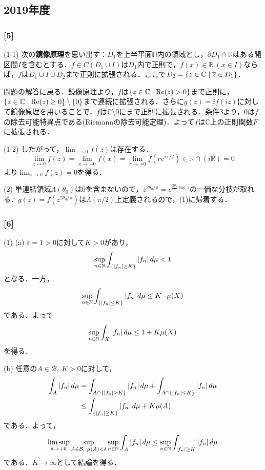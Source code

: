 \documentclass[a4j]{ltjsarticle}
\newcommand{\Rset}{\mathbb{R}}
\newcommand{\Nset}{\mathbb{N}}
\newcommand{\Cset}{\mathbb{C}}
\newcommand{\1}{\mathbbm{1}}
\numberwithin{equation}{section}
\theoremstyle{definition}
\begin{document}
\subsection{2019年度}
\subsubsection*{[5]}
(1-1) 次の\textbf{鏡像原理}を思い出す：$D_1$を上半平面$\mathbb{H}$内の領域とし，$\partial D_1\cap \Rset$はある開区間$I$を含むとする．$f\in C(D_1\cup I)$は$D_1$内で正則で，$f(x)\in\Rset\ (x\in I)$ならば，$f$は$D_1\cup I\cup D_2$まで正則に拡張される．ここで$D_2=\qty{z\in\Cset\mid \overline{z}\in D_1}$．

問題の解答に戻る．鏡像原理より，$f$は$\qty{z\in \Cset\mid \mathrm{Re}(z)>0}$まで正則に，$\qty{z\in\Cset\mid \mathrm{Re}(z)\geq0}\setminus\qty{0}$まで連続に拡張される．さらに$g(z)=if(iz)$に対して鏡像原理を用いることで，$f$は$\Cset\setminus\qty{0}$にまで正則に拡張される．条件3より，$0$は$f$の除去可能特異点である(Riemannの除去可能定理)．よって$f$は$\Cset$上の正則関数$F$に拡張される．

(1-2) したがって，$\lim_{z\to0}f(z)$は存在する．
\begin{equation}
    \lim_{z\to0}f(z)=\lim_{x\to+0}f(x)=\lim_{r\to+0}f(re^{i\pi/2})\in \Rset\cap(i\Rset)=\qty{0}
\end{equation}
より$\lim_{z\to0}f(z)=0$を得る．

(2) 単連結領域$\Lambda(\theta_0)$は$0$を含まないので，$z^{2\theta_0/\pi}=e^{\frac{2\theta_0}{\pi}\log z}$の一価な分枝が取れる．$g(z)=f(z^{2\theta_0/\pi})$は$\Lambda(\pi/2)$上定義されるので，(1)に帰着する．
\subsubsection*{[6]}
(1) (a) $\varepsilon=1>0$に対して$K>0$があり，
\begin{equation}
    \sup_{n\in\Nset}\int_{\qty{\abs{f_n}\geq K}}\abs{f_n}\,d\mu<1
\end{equation}
となる．一方，
\begin{equation}
    \sup_{n\in\Nset}\int_{\qty{\abs{f_n}\leq K}}\abs{f_n}\,d\mu\leq K\cdot\mu(X)
\end{equation}
である．よって
\begin{equation}
    \sup_{n\in\Nset}\int_{X}\abs{f_n}\,d\mu\leq 1+K\mu(X)
\end{equation}
を得る．

(b) 任意の$A\in\mathcal{B},\ K>0$に対して，
\begin{align}
    \int_{A}\abs{f_n}\,d\mu&=\int_{A\cap \qty{\abs{f_n}\geq K}}\abs{f_n}\,d\mu+\int_{A\cap\qty{\abs{f_n}\leq K}}\abs{f_n}\,d\mu\\
    &\leq \int_{\qty{\abs{f_n}\geq K}}\abs{f_n}\,d\mu+K\mu(A)
\end{align}
である．よって，
\begin{equation}
    \limsup_{\delta\to+0}\sup_{A\in\mathcal{B},\ \mu(A)<\delta}\sup_{n\in\Nset}\int_{A}\abs{f_n}\,d\mu\leq \sup_{n\in\Nset}\int_{\abs{f_n}\geq K}\abs{f_n}\,d\mu 
\end{equation}
である．$K\to\infty$として結論を得る．
\end{document}
